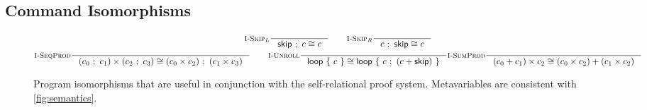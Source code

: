 \documentclass[p.tex]{subfiles}
\begin{document}
\subsection{Command Isomorphisms}

\begin{figure}
\begin{spreadlines}{5pt}
\begin{gather*}
  \inference[$\textsc{I-Skip}_L$]{%
  }{%
    \cseq{\cskip}{c} \cong c
  }
  \qquad
  \inference[$\textsc{I-Skip}_R$]{%
  }{%
    \cseq{c}{\cskip} \cong c
  }
  \\
  \inference[\textsc{I-SeqProd}]{%
  }{%
    \cprod{(\cseq{c_0}{c_1})}{(\cseq{c_2}{c_3})} \cong
    \cseq{(\cprod{c_0}{c_2})}{(\cprod{c_1}{c_3})}
  }
  \qquad
  \inference[\textsc{I-Unroll}]{%
  }{%
    \cloop{c} \cong \cloop{\cseq{c}{(\csum{c}{\cskip})}}
  }
  \inference[\textsc{I-SumProd}]{%
  }{%
    \cprod{(\csum{c_0}{c_1})}{c_2} \cong
    \csum{(\cprod{c_0}{c_2})}{(\cprod{c_1}{c_2})}
  }
\end{gather*}
\end{spreadlines}
\caption{%
  Program isomorphisms that are useful in conjunction with the
  self-relational proof system. Metavariables are consistent with
  \cref{fig:semantics}.
}
\end{figure}
\end{document}
